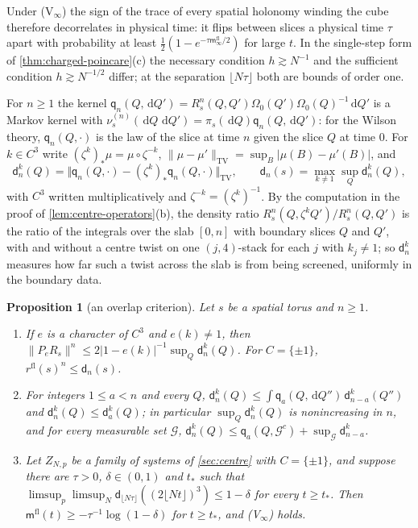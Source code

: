 \documentclass[11pt,a4paper]{amsart}
\newtheorem{proposition}[theorem]{Proposition}
\theoremstyle{definition}
\theoremstyle{remark}
\numberwithin{equation}{section}
\newcommand{\norm}[1]{\lVert #1\rVert}     %
\newcommand{\abs}[1]{\lvert #1\rvert}      %
\newcommand{\dd}{\,\mathrm{d}}             %
\newcommand{\cube}[1]{(2#1)^3}             %
\newcommand{\Omegazero}{\Omega_0}          %
\begin{document}
Under \textup{(V$_\infty$)} the sign of the trace of every spatial holonomy winding the cube therefore decorrelates in physical time: it flips between slices a physical time $\tau$ apart with probability at least $\frac12(1-e^{-\tau\mathsf m^{\mathrm{fl}}_\infty/2})$ for large $t$. In the single-step form of \cref{thm:charged-poincare}(c) the necessary condition $h\gtrsim N^{-1}$ and the sufficient condition $h\gtrsim N^{-1/2}$ differ; at the separation $\lfloor N\tau\rfloor$ both are bounds of order one.

For $n\ge1$ the kernel $\mathsf q_n(Q,\dd Q')=R_s^n(Q,Q')\Omegazero(Q')\Omegazero(Q)^{-1}\dd Q'$ is a Markov kernel with $\nu^{(n)}_s(\dd Q\,\dd Q')=\pi_s(\dd Q)\mathsf q_n(Q,\dd Q')$: for the Wilson theory, $\mathsf q_n(Q,\cdot)$ is the law of the slice at time $n$ given the slice $Q$ at time $0$. For $k\in C^3$ write $(\zeta^k)_*\mu=\mu\circ\zeta^{-k}$, $\norm{\mu-\mu'}_{\mathrm{TV}}=\sup_B\abs{\mu(B)-\mu'(B)}$, and
\[
\mathsf d^k_n(Q)=\bigl\Vert\mathsf q_n(Q,\cdot)-(\zeta^k)_*\mathsf q_n(Q,\cdot)\bigr\Vert_{\mathrm{TV}},\qquad \mathsf d_n(s)=\max_{k\ne1}\sup_Q\mathsf d^k_n(Q),
\]
with $C^3$ written multiplicatively and $\zeta^{-k}=(\zeta^k)^{-1}$.
By the computation in the proof of \cref{lem:centre-operators}(b), the density ratio $R_s^n(Q,\zeta^kQ')/R_s^n(Q,Q')$ is the ratio of the integrals over the slab $[0,n]$ with boundary slices $Q$ and $Q'$, with and without a centre twist on one $(j,4)$-stack for each $j$ with $k_j\ne1$; so $\mathsf d^k_n$ measures how far such a twist across the slab is from being screened, uniformly in the boundary data.

\begin{proposition}[an overlap criterion]\label{prop:overlap-criterion}
Let $s$ be a spatial torus and $n\ge1$.
\begin{enumerate}[label=\textup{(\alph*)},leftmargin=*]
\item If $e$ is a character of $C^3$ and $e(k)\ne1$, then $\norm{P_eR_s}^n\le2\abs{1-e(k)}^{-1}\sup_Q\mathsf d^k_n(Q)$. For $C=\{\pm1\}$, $r^{\mathrm{fl}}(s)^n\le\mathsf d_n(s)$.
\item For integers $1\le a<n$ and every $Q$, $\mathsf d^k_n(Q)\le\int\mathsf q_a(Q,\dd Q'')\,\mathsf d^k_{n-a}(Q'')$ and $\mathsf d^k_n(Q)\le\mathsf d^k_a(Q)$; in particular $\sup_Q\mathsf d^k_n(Q)$ is nonincreasing in $n$, and for every measurable set $\mathcal G$, $\mathsf d^k_n(Q)\le\mathsf q_a(Q,\mathcal G^c)+\sup_{\mathcal G}\mathsf d^k_{n-a}$.
\item Let $Z_{N,p}$ be a family of systems of \cref{sec:centre} with $C=\{\pm1\}$, and suppose there are $\tau>0$, $\delta\in(0,1)$ and $t_*$ such that $\limsup_p\limsup_N\mathsf d_{\lfloor N\tau\rfloor}(\cube{\lfloor Nt\rfloor})\le1-\delta$ for every $t\ge t_*$. Then $\mathsf m^{\mathrm{fl}}(t)\ge-\tau^{-1}\log(1-\delta)$ for $t\ge t_*$, and \textup{(V$_\infty$)} holds.
\end{enumerate}
\end{proposition}
\end{document}

